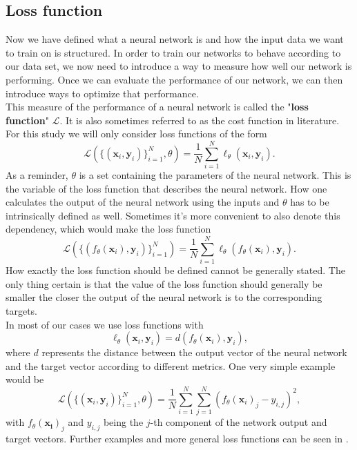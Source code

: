 \subsection{Loss function}
Now we have defined what a neural network is and how the input data we want to train on is structured. In order to train our networks to behave according to our data set, we now need to introduce a way to measure how well our network is performing. Once we can evaluate the performance of our network, we can then introduce ways to optimize that performance.\\
This measure of the performance of a neural network is called the "\textbf{loss function}" $\mathscr{L}$. It is also sometimes referred to as the cost function in literature. For this study we will only consider loss functions of the form 
\begin{equation}
	\mathscr{L}\left( \{(\mathbf{x}_i, \mathbf{y}_i)\}_{i=1}^{N}, \theta \right) = \frac{1}{N} \sum_{i=1}^{N} \ell_\theta\left(\mathbf{x}_i,\mathbf{y}_i\right).
	\label{eq:Loss_longform}
\end{equation}
As a reminder, $\theta$ is a set containing the parameters of the neural network. This is the variable of the loss function that describes the neural network. How one calculates the output of the neural network using the inputs and $\theta$ has to be intrinsically defined as well. Sometimes it's more convenient to also denote this dependency, which would make the loss function
\begin{equation}\label{eq:Loss_longform_withFunctiondependency}
	\mathscr{L}\left( \{(f_\theta(\mathbf{x}_i), \mathbf{y}_i)\}_{i=1}^{N} \right) = \frac{1}{N} \sum_{i=1}^{N} \ell_\theta\left(f_\theta(\mathbf{x}_i),\mathbf{y}_i\right).
\end{equation}
How exactly the loss function should be defined cannot be generally stated. The only thing certain is that the value of the loss function should generally be smaller the closer the output of the neural network is to the corresponding targets.\\
In most of our cases we use loss functions with 
\begin{equation}
	\ell_\theta \left( \mathbf{x}_i,\mathbf{y}_i\right) = 
	d\left(f_\theta(\mathbf{x}_i), \mathbf{y}_i\right),
\end{equation}
where $d$ represents the distance between the output vector of the neural network and the target vector according to different metrics. One very simple example would be 
\begin{equation}
	\mathscr{L}\left( \{(\mathbf{x}_i, \mathbf{y}_i)\}_{i=1}^{N}, \theta \right) = \frac{1}{N} \sum_{i=1}^{N} \sum_{j=1}^{N} \left(f_\theta(\mathbf{x}_i)_j - y_{i,j}\right)^2,
\end{equation}
with $f_\theta(\mathbf{x_{i}})_j$ and $y_{i,j}$ being the $j$-th component of the network output and target vectors. Further examples and more general loss functions can be seen in \cite{LossExamplePaper}.


